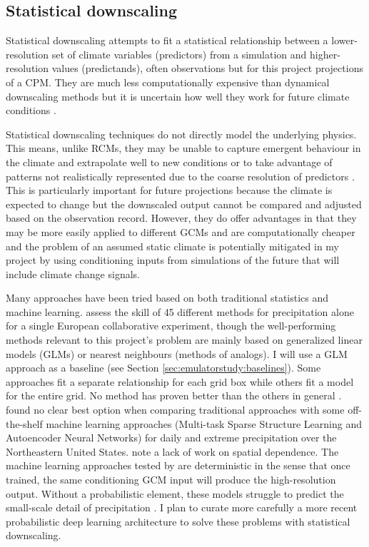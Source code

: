 \subsection{Statistical downscaling} \label{sec:downscalingbg:statistical}

Statistical downscaling attempts to fit a statistical relationship between a lower-resolution set of climate variables (predictors) from a simulation and higher-resolution values (predictands), often observations but for this project projections of a CPM. They are much less computationally expensive than dynamical downscaling methods but it is uncertain how well they work for future climate conditions \cite{maraun2019sddownscaling}.

Statistical downscaling techniques do not directly model the underlying physics. This means, unlike RCMs, they may be unable to capture emergent behaviour in the climate and extrapolate well to new conditions or to take advantage of patterns not realistically represented due to the coarse resolution of predictors \cite{maraun2019sddownscaling}. This is particularly important for future projections because the climate is expected to change but the downscaled output cannot be compared and adjusted based on the observation record. However, they do offer advantages in that they may be more easily applied to different GCMs and are computationally cheaper and the problem of an assumed static climate is potentially mitigated in my project by using conditioning inputs from simulations of the future that will include climate change signals.

Many approaches have been tried based on both traditional statistics and machine learning. \textcite{gutierrez2019sdcomparison} assess the skill of 45 different methods for precipitation alone for a single European collaborative experiment, though the well-performing methods relevant to this project's problem are mainly based on generalized linear models (GLMs) or nearest neighbours (methods of analogs). I will use a GLM approach as a baseline (see Section \ref{sec:emulatorstudy:baselines}). Some approaches fit a separate relationship for each grid box while others fit a model for the entire grid. No method has proven better than the others in general \cite{gutierrez2019sdcomparison, vandal2018mldownscaling, fowler2007downscaling4hydrology}. \textcite{vandal2018mldownscaling} found no clear best option when comparing traditional approaches with some off-the-shelf machine learning approaches (Multi-task Sparse Structure Learning and Autoencoder Neural Networks) for daily and extreme precipitation over the Northeastern United States. \textcite{maraun2019sddownscaling} note a lack of work on spatial dependence. The machine learning approaches tested by \textcite{vandal2018mldownscaling} are deterministic in the sense that once trained, the same conditioning GCM input will produce the high-resolution output. Without a probabilistic element, these models struggle to predict the small-scale detail of precipitation \cite{ravuri2021deepgenprecip}. I plan to curate more carefully a more recent probabilistic deep learning architecture to solve these problems with statistical downscaling.


